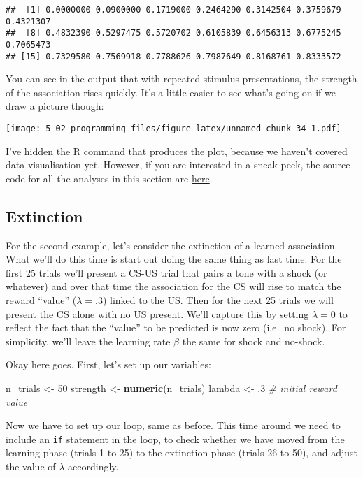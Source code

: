 \documentclass[]{book}
\newenvironment{Shaded}{\begin{snugshade}}{\end{snugshade}}
\newcommand{\CommentTok}[1]{\textcolor[rgb]{0.56,0.35,0.01}{\textit{#1}}}
\newcommand{\DecValTok}[1]{\textcolor[rgb]{0.00,0.00,0.81}{#1}}
\newcommand{\FloatTok}[1]{\textcolor[rgb]{0.00,0.00,0.81}{#1}}
\newcommand{\KeywordTok}[1]{\textcolor[rgb]{0.13,0.29,0.53}{\textbf{#1}}}
\newcommand{\NormalTok}[1]{#1}
\newcommand{\StringTok}[1]{\textcolor[rgb]{0.31,0.60,0.02}{#1}}
\begin{document}
\begin{verbatim}
##  [1] 0.0000000 0.0900000 0.1719000 0.2464290 0.3142504 0.3759679 0.4321307
##  [8] 0.4832390 0.5297475 0.5720702 0.6105839 0.6456313 0.6775245 0.7065473
## [15] 0.7329580 0.7569918 0.7788626 0.7987649 0.8168761 0.8333572
\end{verbatim}

You can see in the output that with repeated stimulus presentations, the strength of the association rises quickly. It's a little easier to see what's going on if we draw a picture though:

\texttt{[image: 5-02-programming\_files/figure-latex/unnamed-chunk-34-1.pdf]}

I've hidden the R command that produces the plot, because we haven't covered data visualisation yet. However, if you are interested in a sneak peek, the source code for all the analyses in this section are \href{./scripts/rescorla_wagner.R}{here}.

\hypertarget{extinction}{%
\subsection{Extinction}\label{extinction}}

For the second example, let's consider the extinction of a learned association. What we'll do this time is start out doing the same thing as last time. For the first 25 trials we'll present a CS-US trial that pairs a tone with a shock (or whatever) and over that time the association for the CS will rise to match the reward ``value'' (\(\lambda = .3\)) linked to the US. Then for the next 25 trials we will present the CS alone with no US present. We'll capture this by setting \(\lambda = 0\) to reflect the fact that the ``value'' to be predicted is now zero (i.e.~no shock). For simplicity, we'll leave the learning rate \(\beta\) the same for shock and no-shock.

Okay here goes. First, let's set up our variables:

\begin{Shaded}
\begin{Highlighting}[]
\NormalTok{n_trials <-}\StringTok{ }\DecValTok{50}                
\NormalTok{strength <-}\StringTok{ }\KeywordTok{numeric}\NormalTok{(n_trials) }
\NormalTok{lambda <-}\StringTok{ }\FloatTok{.3} \CommentTok{# initial reward value }
\end{Highlighting}
\end{Shaded}

Now we have to set up our loop, same as before. This time around we need to include an \texttt{if} statement in the loop, to check whether we have moved from the learning phase (trials 1 to 25) to the extinction phase (trials 26 to 50), and adjust the value of \(\lambda\) accordingly.
\end{document}
